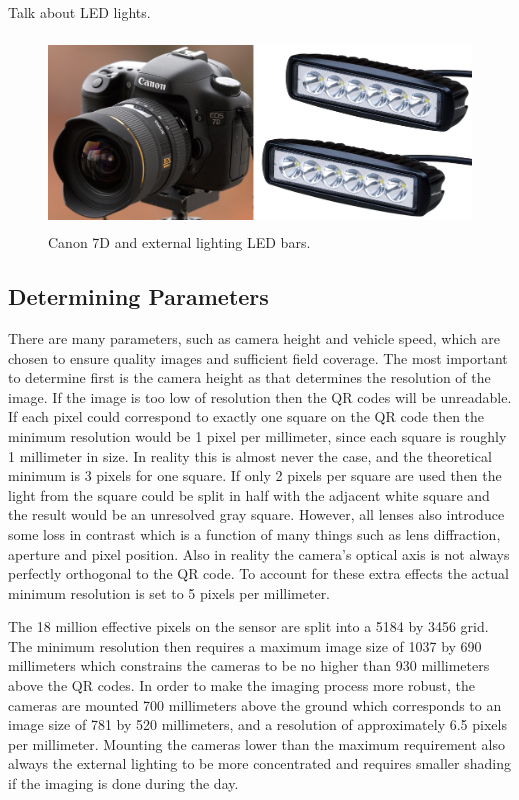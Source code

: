 Talk about LED lights.  

\begin{figure}[htb]
	\centering
    \includegraphics[height=2in]{figures/canon7d_and_LEDs.png}
    \caption[Canon 7D and LED bars]{Canon 7D and external lighting LED bars.}
    \label{figure:canon_and_bars}
\end{figure}

\subsection{Determining Parameters}

There are many parameters, such as camera height and vehicle speed, which are chosen to ensure quality images and sufficient field coverage.  The most important to determine first is the camera height as that determines the resolution of the image.  If the image is too low of resolution then the QR codes will be unreadable.  If each pixel could correspond to exactly one square on the QR code then the minimum resolution would be 1 pixel per millimeter, since each square is roughly 1 millimeter in size.  In reality this is almost never the case, and the theoretical minimum is 3 pixels for one square.  If only 2 pixels per square are used then the light from the square could be split in half with the adjacent white square and the result would be an unresolved gray square.  However, all lenses also introduce some loss in contrast which is a function of many things such as lens diffraction, aperture and pixel position.  Also in reality the camera's optical axis is not always perfectly orthogonal to the QR code.  To account for these extra effects the actual minimum resolution is set to 5 pixels per millimeter.  

The 18 million effective pixels on the sensor are split into a 5184 by 3456 grid.  The minimum resolution then requires a maximum image size of 1037 by 690 millimeters which constrains the cameras to be no higher than 930 millimeters above the QR codes.  In order to make the imaging process more robust, the cameras are mounted 700 millimeters above the ground which corresponds to an image size of 781 by 520 millimeters, and a resolution of approximately 6.5 pixels per millimeter.  Mounting the cameras lower than the maximum requirement also always the external lighting to be more concentrated and requires smaller shading if the imaging is done during the day.  

